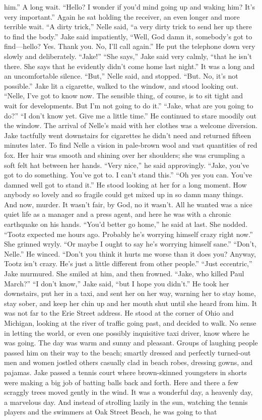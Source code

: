 \documentclass{novel}
\begin{document}
him.” A long wait. “Hello? I wonder if you’d mind going up and waking him? It’s very important.” Again he sat holding the receiver, an even longer and more terrible wait. “A dirty trick,” Nelle said, “a very dirty trick to send her up there to find the body.” Jake said impatiently, “Well, God damn it, somebody’s got to find—hello? Yes. Thank you. No, I'll call again.” He put the telephone down very slowly and deliberately. “Jake!” “She says,” Jake said very calmly, “that he isn’t there. She says that he evidently didn’t come home last night.” It was a long and an uncomfortable silence. “But,” Nelle said, and stopped. “But. No, it’s not possible.” Jake lit a cigarette, walked to the window, and stood looking out. “Nelle, I’ve got to know now. The sensible thing, of course, is to sit tight and wait for developments. But I’m not going to do it.” “Jake, what are you going to do?” “I don’t know yet. Give me a little time.” He continued to stare moodily out the window. The arrival of Nelle’s maid with her clothes was a welcome diversion. Jake tactfully went downstairs for cigarettes he didn’t need and returned fifteen minutes later. To find Nelle a vision in pale-brown wool and vast quantities of red fox. Her hair was smooth and shining over her shoulders; she was crumpling a soft felt hat between her hands. “Very nice,” he said approvingly. “Jake, you’ve got to do something. You’ve got to. I can’t stand this.” “Oh yes you can. You’ve damned well got to stand it.” He stood looking at her for a long moment. How anybody so lovely and so fragile could get mixed up in so damn many things. And now, murder. It wasn’t fair, by God, no it wasn’t. All he wanted was a nice quiet life as a manager and a press agent, and here he was with a chronic earthquake on his hands. “You’d better go home,” he said at last. She nodded. “Tootz expected me hours ago. Probably he’s worrying himself crazy right now.” She grinned wryly. “Or maybe I ought to say he’s worrying himself sane.” “Don’t, Nelle.” He winced. “Don’t you think it hurts me worse than it does you? Anyway, Tootz isn’t crazy. He’s just a little different from other people.” “Just eccentric,” Jake murmured. She smiled at him, and then frowned. “Jake, who killed Paul March?” “I don’t know,” Jake said, “but I hope you didn’t.” He took her downstairs, put her in a taxi, and sent her on her way, warning her to stay home, stay sober, and keep her chin up and her mouth shut until she heard from him. It was not far to the Erie Street address. He stood at the corner of Ohio and Michigan, looking at the river of traffic going past, and decided to walk. No sense in letting the world, or even one possibly inquisitive taxi driver, know where he was going. The day was warm and sunny and pleasant. Groups of laughing people passed him on their way to the beach; smartly dressed and perfectly turned-out men and women jostled others casually clad in beach robes, dressing gowns, and pajamas. Jake passed a tennis court where brown-skinned youngsters in shorts were making a big job of batting balls back and forth. Here and there a few scraggly trees moved gently in the wind. It was a wonderful day, a heavenly day, a marvelous day. And instead of strolling lazily in the sun, watching the tennis players and the swimmers at Oak Street Beach, he was going to that 
\end{document}
